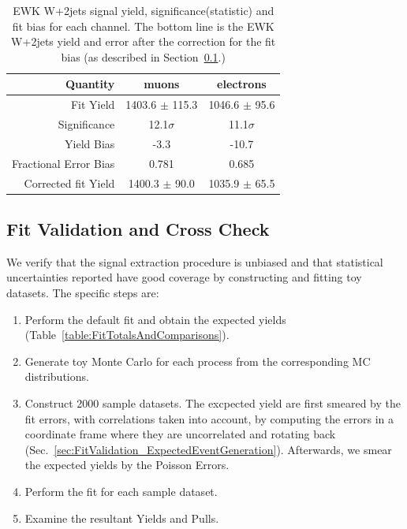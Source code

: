 \begin{table}[bthp]
\begin{center}
\caption{\label{tab:SystematicCorrections} EWK W+2jets signal yield, significance(statistic) and fit bias for each channel. The bottom line is the EWK W+2jets yield and error after the correction for the fit bias (as described in Section~\ref{sec:FitValidation}.)}
\label{table:FitCorrectedYields}
\begin{tabular}{rcc}
\hline\hline
Quantity       & muons & electrons \\
\hline
Fit Yield      &  1403.6 $\pm$ 115.3   &  1046.6 $\pm$ 95.6 \\
Significance   &  12.1$\sigma$   & 11.1$\sigma$ \\
Yield Bias     &   -3.3     &  -10.7 \\
Fractional Error Bias & 	0.781     &  0.685  \\
\hline
Corrected fit Yield      &  1400.3 $\pm$ 90.0   &  1035.9 $\pm$ 65.5 \\
\hline
\hline\hline
\end{tabular}
\end{center}
\end{table}

\clearpage
\subsection{Fit Validation and Cross Check}
\label{sec:FitValidation}
We verify that the signal extraction procedure is unbiased and that 
statistical uncertainties reported have good coverage by constructing
and fitting toy datasets. 
The specific steps are:
\begin{enumerate}
\item Perform the default fit and obtain the expected yields 
(Table~\ref{table:FitTotalsAndComparisons}).
\item Generate toy Monte Carlo for each process from the corresponding MC distributions.
\item Construct 2000 sample datasets. The excpected yield are first smeared by the fit 
errors, with correlations taken into account, by computing the errors in a coordinate frame 
where they are uncorrelated and rotating back (Sec.~\ref{sec:FitValidation_ExpectedEventGeneration}). 
Afterwards, we smear the expected yields by the Poisson Errors.
\item Perform the fit for each sample dataset.
\item Examine the resultant Yields and Pulls.
\end{enumerate}


